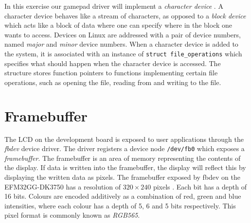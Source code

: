 In this exercise our gamepad driver will implement a \emph{character device}
\cite{ldd}. A character device behaves like a stream of characters, as opposed
to a \emph{block device} which acts like a block of data where one can specify
where in the block one wants to access. Devices on Linux are addressed with a
pair of device numbers, named \emph{major} and \emph{minor} device numbers. When
a character device is added to the system, it is associated with an instance of
\texttt{struct file\_operations} which specifies what should happen when the
character device is accessed. The structure stores function pointers to
functions implementing certain file operations, such as opening the file,
reading from and writing to the file.

\section{Framebuffer}

The LCD on the development board is exposed to user applications through the
\emph{fbdev} device driver. The driver registers a device node \texttt{/dev/fb0}
which exposes a \emph{framebuffer}. The framebuffer is an area of memory
representing the contents of the display. If data is written into the
framebuffer, the display will reflect this by displaying the written data as
pixels. The framebuffer exposed by fbdev on the EFM32GG-DK3750 has a resolution
of \(320 \times 240\) pixels \cite{TDT4528Compendium}. Each bit has a depth of
16 bits. Colours are encoded additively as a combination of red, green and blue
intensities, where each colour has a depth of 5, 6 and 5 bits respectively. This
pixel format is commonly known as \emph{RGB565}.
